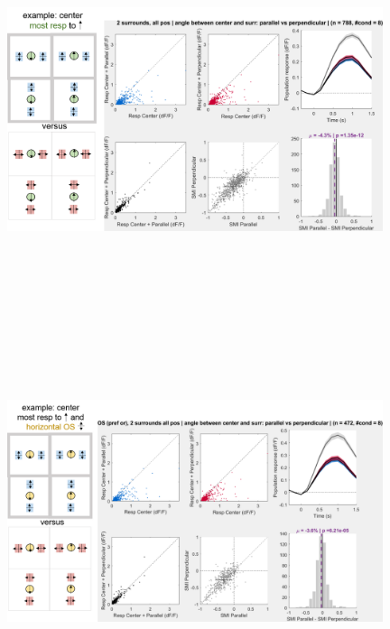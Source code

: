 \begin{figure}[H] \centering \includegraphics[width=11cm,height=11cm,keepaspectratio]{Figures/7.Results/population/sel/diagrams/8.png} 
\end{figure}

\begin{figure}[H] \centering \includegraphics[width=11cm,height=11cm,keepaspectratio]{Figures/7.Results/population/sel/diagrams/9.png} 
\end{figure}


